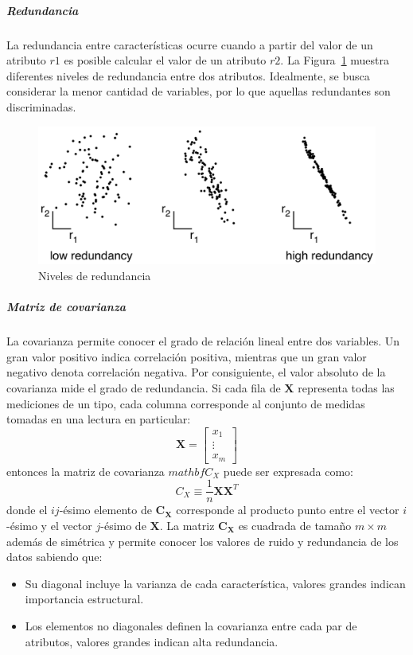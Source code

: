 \documentclass{article}
\begin{document}
\subparagraph{Redundancia}
\label{subp:redundancia}
La redundancia entre características ocurre cuando a partir del valor de un atributo $r1$ es posible calcular el valor de un atributo $r2$.
La Figura~\ref{fig:redundancia} muestra diferentes niveles de redundancia entre dos atributos.
Idealmente, se busca considerar la menor cantidad de variables, por lo que aquellas redundantes son discriminadas.
\begin{figure}
	\centering
	\includegraphics[width=\columnwidth]{resources/images/redundancia}
	\caption{Niveles de redundancia}
	\label{fig:redundancia}
\end{figure}

\subparagraph{Matriz de covarianza}
\label{subp:matriz_de_covarianza}
La covarianza permite conocer el grado de relación lineal entre dos variables.
Un gran valor positivo indica correlación positiva, mientras que un gran valor negativo denota correlación negativa.
Por consiguiente, el valor absoluto de la covarianza mide el grado de redundancia.
Si cada fila de $\mathbf{X}$ representa todas las mediciones de un tipo, cada columna corresponde al conjunto de medidas tomadas en una lectura en particular:
$$
\mathbf{X} = 
\begin{bmatrix}
x_1 \\
\vdots \\
x_m
\end{bmatrix}
$$
entonces la matriz de covarianza $mathbf{C_X}$ puede ser expresada como:
$$
C_X \equiv \frac{1}{n}\mathbf{XX}^T
$$
donde el $ij$-ésimo elemento de $\mathbf{C_X}$ corresponde al producto punto entre el vector $i$-ésimo y el vector $j$-ésimo de $\mathbf{X}$.
La matriz $\mathbf{C_X}$ es cuadrada de tamaño $m \times m$ además de simétrica y permite conocer los valores de ruido y redundancia de los datos sabiendo que:
\begin{itemize}
	\item Su diagonal incluye la varianza de cada característica, valores grandes indican importancia estructural.
	\item Los elementos no diagonales definen la covarianza entre cada par de atributos, valores grandes indican alta redundancia.
\end{itemize}
\end{document}
